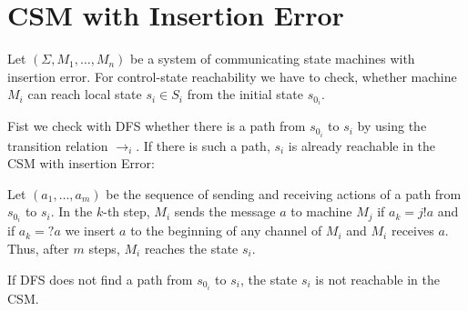 \section{CSM with Insertion Error}
Let $(\Sigma, M_1, \dots, M_n)$ be a system of communicating state machines with insertion error. For control-state reachability we have to check, whether machine $M_i$ can reach local state $s_i \in S_i$ from the initial state $s_{0_i}$.

Fist we check with DFS whether there is a path from $s_{0_i}$ to $s_i$ by using the transition relation $\rightarrow_i$. If there is such a path, $s_i$ is already reachable in the CSM with insertion Error:

Let $(a_1, \dots, a_m)$ be the sequence of sending and receiving actions of a path from $s_{0_i}$ to $s_i$. In the $k$-th step, $M_i$ sends the message $a$ to machine $M_j$ if $a_k = j!a$ and if $a_k = ?a$ we insert $a$ to the beginning of any channel of $M_i$ and $M_i$ receives $a$. Thus, after $m$ steps, $M_i$ reaches the state $s_i$.

If DFS does not find a path from $s_{0_i}$ to $s_i$, the state $s_i$ is not reachable in the CSM.